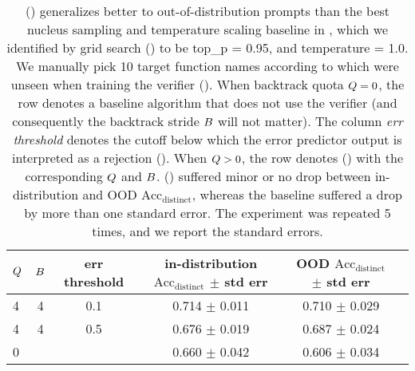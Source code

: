\begin{table*}[h]
\begin{center}
\begin{small}
\begin{tabular}{ lccccc }
\toprule
\textbf{$Q$} & \textbf{$B$} & \textbf{err threshold} & \textbf{in-distribution $\text{Acc}_\text{distinct}$ $\pm$ std err} & \textbf{OOD $\text{Acc}_\text{distinct}$ $\pm$ std err} \\
\hline
4 & 4 & 0.1 & 0.714 $\pm$ 0.011 & 0.710 $\pm$ 0.029  \\
\hline
4 & 4 & 0.5 & 0.676 $\pm$ 0.019 &  0.687 $\pm$ 0.024  \\
\hline
0 &   &    & 0.660 $\pm$ 0.042 &  0.606 $\pm$ 0.034  \\
\bottomrule
\end{tabular}
\end{small}
\end{center}
\caption{
\algoName ()
generalizes better to out-of-distribution prompts
than the best nucleus sampling and temperature scaling baseline in ,
which we identified by grid search () to be 
top\_p = 0.95,
and temperature = 1.0.
We manually pick 10 target function names according to 
which were unseen when training the verifier ().
When backtrack quota $Q = 0$,
the row denotes a baseline algorithm that does not use the verifier
(and consequently the backtrack stride $B$ will not matter).
The column \emph{err threshold} denotes the cutoff below which the error predictor output is interpreted as a rejection ().
When $Q > 0$,
the row denotes \algoName () 
with the corresponding $Q$ and $B$.
\algoName ()
suffered minor or no drop between in-distribution and OOD $\text{Acc}_\text{distinct}$, 
whereas the baseline suffered a drop by more than one standard error.
The experiment was repeated 5 times,
and we report the standard errors.
}
\label{table:codellama_ood}
\end{table*}



\clearpage
